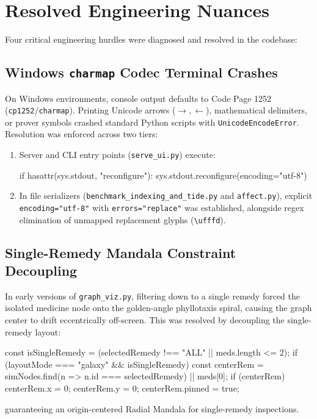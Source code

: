 \documentclass[10pt,twocolumn,letterpaper]{article}
\begin{document}
\section{Resolved Engineering Nuances}
Four critical engineering hurdles were diagnosed and resolved in the codebase:

\subsection{Windows \texttt{charmap} Codec Terminal Crashes}
On Windows environments, console output defaults to Code Page 1252 (\texttt{cp1252}/\texttt{charmap}). Printing Unicode arrows ($\rightarrow, \leftarrow$), mathematical delimiters, or prover symbols crashed standard Python scripts with \texttt{UnicodeEncodeError}.
Resolution was enforced across two tiers:
\begin{enumerate}
  \item Server and CLI entry points (\texttt{serve\_ui.py}) execute:
  \begin{codeblock}
if hasattr(sys.stdout, "reconfigure"):
    sys.stdout.reconfigure(encoding="utf-8")
  \end{codeblock}
  \item In file serializers (\nolinkurl{benchmark_indexing_and_tide.py} and \texttt{affect.py}), explicit \texttt{encoding="utf-8"} with \texttt{errors="replace"} was established, alongside regex elimination of unmapped replacement glyphs (\texttt{\textbackslash ufffd}).
\end{enumerate}

\subsection{Single-Remedy Mandala Constraint Decoupling}
In early versions of \texttt{graph\_viz.py}, filtering down to a single remedy forced the isolated medicine node onto the golden-angle phyllotaxis spiral, causing the graph center to drift eccentrically off-screen.
This was resolved by decoupling the single-remedy layout:
\begin{codeblock}
const isSingleRemedy = (selectedRemedy !== "ALL" || meds.length <= 2);
if (layoutMode === "galaxy" && isSingleRemedy) {
  const centerRem = simNodes.find(n => n.id === selectedRemedy) || meds[0];
  if (centerRem) { centerRem.x = 0; centerRem.y = 0; centerRem.pinned = true; }
}
\end{codeblock}
guaranteeing an origin-centered Radial Mandala for single-remedy inspections.
\end{document}
